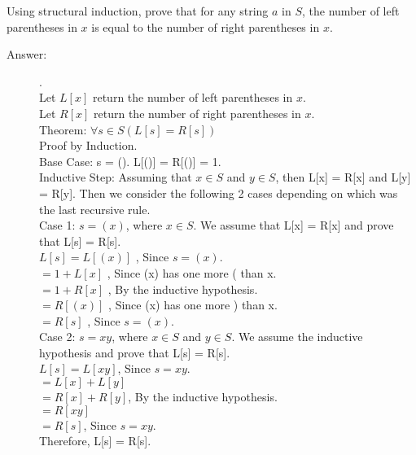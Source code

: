 \documentclass[12pt, oneside]{article}
\begin{document}
\begin{enumerate}
Using structural induction, prove that for any string $a$ in $S$, the number of left parentheses in $x$ is equal to the number of right parentheses in $x$.

\begin{description}
    \item[Answer:] .\\
    Let $L[x]$ return the number of left parentheses in $x$. \\
    Let $R[x]$ return the number of right parentheses in $x$.\\
    
    Theorem: $\forall s \in S (L[s] = R[s])$ \\

    Proof by Induction. \\
    Base Case: s = (). L[()] = R[()] = 1. \\
    Inductive Step: Assuming that $x \in S$ and $y \in S$, then L[x] = R[x] and L[y] = R[y]. Then we consider the following 2 cases depending on which was the last recursive rule.\\

    Case 1: $s=(x)$, where $x \in S$. We assume that L[x] = R[x] and prove that L[s] = R[s].\\
    
    $L[s] = L[(x)]$ , Since $s=(x)$.\\
    $= 1+L[x]$ , Since (x) has one more ( than x.\\
    $= 1+R[x]$ , By the inductive hypothesis.\\
    $= R[(x)]$ , Since (x) has one more ) than x.\\
    $= R[s]$ , Since $s=(x)$.\\

    Case 2: $s=xy$, where $x \in S$ and $y \in S$. We assume the inductive hypothesis and prove that L[s] = R[s].\\

    $L[s] = L[xy]$, Since $s=xy$.\\
    $=L[x] + L[y]$ \\
    $=R[x]+R[y]$, By the inductive hypothesis.\\
    $=R[xy]$ \\
    $=R[s]$, Since $s=xy$. \\

    Therefore, L[s] = R[s].

\end{description}

\end{enumerate}
\end{document}
